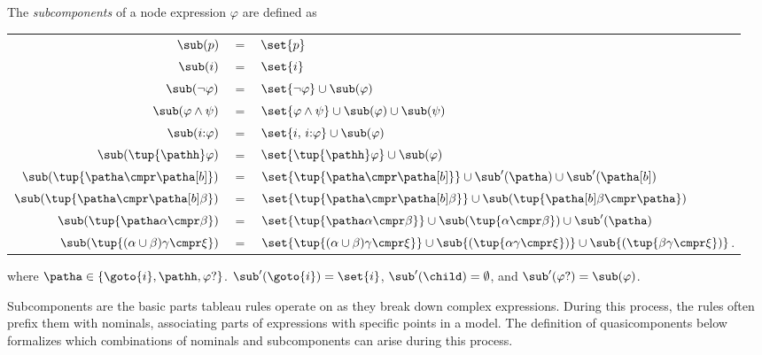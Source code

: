 \begin{defi} \label{def:subformulas}
    The \emph{subcomponents} of a node expression $\varphi$ are defined as
        \begin{longtable}{r@{\ }c@{\ }l}
            $\sub(p)$
            & $=$ & $\set{p}$ \\
            $\sub(i)$
            & $=$ & $\set{i}$ \\
            $\sub(\lnot \varphi)$
            & $=$ & $\set{\lnot \varphi} \cup \sub(\varphi)$ \\
            $\sub(\varphi \land \psi)$
            & $=$ & $\set{\varphi \land \psi} \cup \sub(\varphi) \cup \sub({\psi})$  \\            
            $\sub(i{:}\varphi)$
            & $=$ & $\set{i,\, i{:}\varphi} \cup \sub(\varphi)$ \\
            $\sub(\tup{\pathh} \varphi)$ 
            & $=$ & $\set{ \tup{\pathh} \varphi} \cup \sub(\varphi)$ \\  
            $\sub(\tup{ \patha \cmpr \patha[b] })$
            & $=$ & $\set{\tup{ \patha \cmpr \patha[b]}} \cup \sub'(\patha) \cup \sub'(\patha[b])$ \\
            $\sub(\tup{\patha \cmpr \patha[b]\beta})$
            & $=$ & $\set{\tup{\patha \cmpr \patha[b]\beta}} \cup \sub(\tup{\patha[b]\beta \cmpr \patha})$ \\
            $\sub(\tup{\patha\alpha \cmpr \beta})$
            & $=$ & $\set{\tup{\patha\alpha \cmpr \beta}} \cup \sub(\tup{\alpha \cmpr \beta}) \cup \sub'(\patha)$ \\
            $\sub(\tup{ (\alpha \cup \beta) \gamma \cmpr \xi })$
            & $=$ & $\set{\tup{ (\alpha \cup \beta) \gamma \cmpr \xi }} \cup \sub{(\tup{ \alpha \gamma \cmpr \xi })} \cup \sub{(\tup{ \beta \gamma \cmpr \xi })}$.
        \end{longtable}
    where $\patha \in \{\goto{i}, \pathh, \varphi?\}$. %
    $\sub'(\goto{i}) = \set{i}$, $\sub'(\child) = \emptyset$, and $\sub'(\varphi?) = \sub(\varphi)$.
\end{defi}

Subcomponents are the basic parts tableau rules operate on as they break down complex expressions.
During this process, the rules often prefix them with nominals, associating parts of expressions with specific points in a model. The definition of quasicomponents below formalizes which combinations of nominals and subcomponents can arise during this process.


